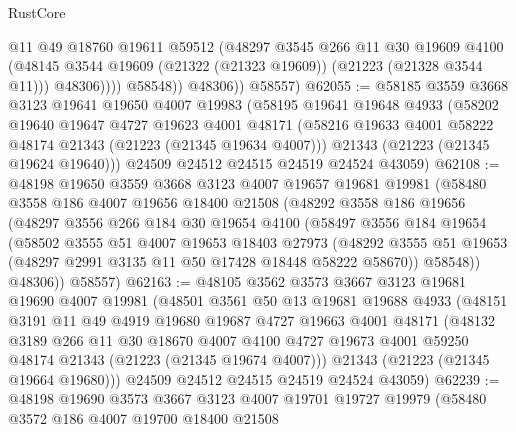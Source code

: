 \begin{lexlean}{RustCore}
\begin{coremodule}
                    @11
                    @49
                    @18760
                    @19611
                    @59512
                    (@48297
                      @3545
                      @266
                      @11
                      @30
                      @19609
                      @4100
                      (@48145 @3544 @19609 (@21322 (@21323 @19609)) (@21223 (@21328 @3544 @11)))
                      @48306))))
              @58548))
          @48306))
      @58557)
@62055 := @58185
    @3559
    @3668
    @3123
    @19641
    @19650
    @4007
    @19983
    (@58195
      @19641
      @19648
      @4933
      (@58202
        @19640
        @19647
        @4727
        @19623
        @4001
        @48171
        (@58216 @19633 @4001 @58222 @48174 @21343 (@21223 (@21345 @19634 @4007)))
        @21343
        (@21223 (@21345 @19624 @19640)))
      @24509
      @24512
      @24515
      @24519
      @24524
      @43059)
@62108 := @48198
    @19650
    @3559
    @3668
    @3123
    @4007
    @19657
    @19681
    @19981
    (@58480
      @3558
      @186
      @4007
      @19656
      @18400
      @21508
      (@48292
        @3558
        @186
        @19656
        (@48297
          @3556
          @266
          @184
          @30
          @19654
          @4100
          (@58497
            @3556
            @184
            @19654
            (@58502
              @3555
              @51
              @4007
              @19653
              @18403
              @27973
              (@48292 @3555 @51 @19653 (@48297 @2991 @3135 @11 @50 @17428 @18448 @58222 @58670))
              @58548))
          @48306))
      @58557)
@62163 := @48105
    @3562
    @3573
    @3667
    @3123
    @19681
    @19690
    @4007
    @19981
    (@48501
      @3561
      @50
      @13
      @19681
      @19688
      @4933
      (@48151
        @3191
        @11
        @49
        @4919
        @19680
        @19687
        @4727
        @19663
        @4001
        @48171
        (@48132
          @3189
          @266
          @11
          @30
          @18670
          @4007
          @4100
          @4727
          @19673
          @4001
          @59250
          @48174
          @21343
          (@21223 (@21345 @19674 @4007)))
        @21343
        (@21223 (@21345 @19664 @19680)))
      @24509
      @24512
      @24515
      @24519
      @24524
      @43059)
@62239 := @48198
    @19690
    @3573
    @3667
    @3123
    @4007
    @19701
    @19727
    @19979
    (@58480
      @3572
      @186
      @4007
      @19700
      @18400
      @21508

\end{coremodule}
\end{lexlean}
